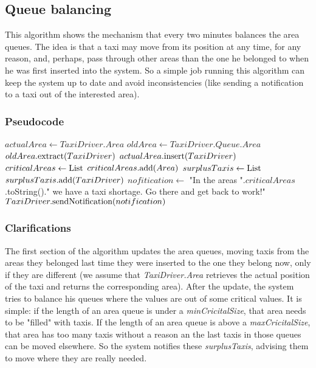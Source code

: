	\subsection{Queue balancing}
	This algorithm shows the mechanism that every two minutes balances the area queues.
	The idea is that a taxi may move from its position at any time, for any reason, and, perhaps,
	pass through other areas than the one he belonged to when he was first inserted into the system.
	So a simple job running this algorithm can keep the system up to date and avoid inconsistencies
	(like sending a notification to a taxi out of the interested area).
		\subsubsection{Pseudocode}
		\begin{algorithm}
			\begin{algorithmic}[1]
					\State $actualArea \gets TaxiDriver.Area$
					\State $oldArea \gets TaxiDriver.Queue.Area$
						\State $oldArea.\textnormal{extract}(TaxiDriver)$
						\State $actualArea.\textnormal{insert}(TaxiDriver)$
					\EndIf
				\EndFor
				\State $criticalAreas \gets \textnormal{List}$
						\State $criticalAreas.\textnormal{add}(Area)$
					\EndIf
				\EndFor
				\State $surplusTaxis \gets \textnormal{List}$
						\State $surplusTaxis.\textnormal{add}(TaxiDriver)$
					\EndFor
				\EndFor
				\State $nofitication \gets$ "In the areas ".$criticalAreas$.toString()." we have a taxi shortage.
					Go there and get back to work!"
					\State $TaxiDriver.\textnormal{sendNotification}(notification)$
				\EndFor
			\end{algorithmic}
		\end{algorithm}
		\subsubsection{Clarifications}
		The first section of the algorithm updates the area queues, moving taxis from the areas they belonged last
		time they were inserted to the one they belong now, only if they are different (we assume that
		\textit{TaxiDriver.Area} retrieves the actual position of the taxi and returns the corresponding area).
		After the update, the system tries to balance his queues where the values are out of some critical values.
		It is simple: if the length of an area queue is under a \textit{minCricitalSize}, that area needs to be
		"filled" with taxis. If the length of an area queue is above a \textit{maxCricitalSize}, that area has
		too many taxis without a reason an the last taxis in those queues can be moved elsewhere.
		So the system notifies these \textit{surplusTaxis}, advising them to move where they are really needed.